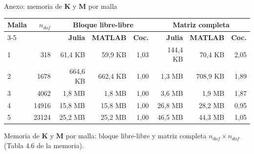 \documentclass{beamer}
\begin{document}
\begin{frame}{Anexo: memoria de $\mathbf{K}$ y $\mathbf{M}$ por malla}
  \vspace{-0.35cm}
  \begin{center}
    \scriptsize
    \begin{tabular}{lrrrrrrr}
      \hline
      \textbf{Malla} & \textbf{$n_{dof}$} &
      \multicolumn{3}{c}{\textbf{Bloque libre-libre}} &
      \multicolumn{3}{c}{\textbf{Matriz completa}}\\
      \cline{3-5} \cline{6-8}
      & & \textbf{Julia} & \textbf{MATLAB} & \textbf{Coc.} &
      \textbf{Julia} & \textbf{MATLAB} & \textbf{Coc.}\\
      \hline
      1 & 318   & 61{,}4 KB & 59{,}9 KB & 1{,}03 & 144{,}4 KB & 70{,}4 KB  & 2{,}05\\
      2 & 1678  & 664{,}6 KB & 662{,}4 KB & 1{,}00 & 1{,}3 MB & 708{,}9 KB & 1{,}89\\
      3 & 4062  & 1{,}8 MB & 1{,}8 MB & 1{,}00 & 3{,}6 MB & 1{,}9 MB & 1{,}87\\
      4 & 14916 & 15{,}8 MB & 15{,}8 MB & 1{,}00 & 26{,}8 MB & 28{,}2 MB & 0{,}95\\
      5 & 23124 & 25{,}2 MB & 25{,}2 MB & 1{,}00 & 46{,}5 MB & 44{,}3 MB & 1{,}05\\
      \hline
    \end{tabular}
  \end{center}
  \vspace{0.1cm}
  {\scriptsize Memoria de $\mathbf{K}$ y $\mathbf{M}$ por malla: bloque
  libre-libre y matriz completa $n_{dof}\times n_{dof}$ (Tabla 4.6 de la memoria).}
  \label{lastanexoframe}
\end{frame}
\end{document}

